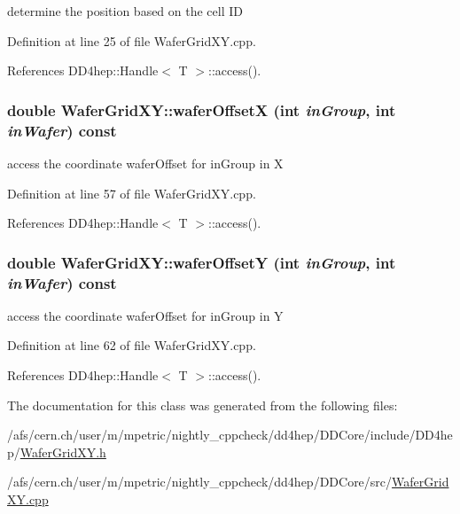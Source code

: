 determine the position based on the cell ID 

Definition at line 25 of file WaferGridXY.cpp.

References DD4hep::Handle$<$ T $>$::access().\hypertarget{class_d_d4hep_1_1_geometry_1_1_wafer_grid_x_y_a587a683c8e578dfe12d5d8ebbcf02633}{
\subsubsection[{waferOffsetX}]{\setlength{\rightskip}{0pt plus 5cm}double WaferGridXY::waferOffsetX (int {\em inGroup}, \/  int {\em inWafer}) const}}
\label{class_d_d4hep_1_1_geometry_1_1_wafer_grid_x_y_a587a683c8e578dfe12d5d8ebbcf02633}


access the coordinate waferOffset for inGroup in X 

Definition at line 57 of file WaferGridXY.cpp.

References DD4hep::Handle$<$ T $>$::access().\hypertarget{class_d_d4hep_1_1_geometry_1_1_wafer_grid_x_y_a010307d07b0a6a9d9cc3d5a8655864b7}{
\subsubsection[{waferOffsetY}]{\setlength{\rightskip}{0pt plus 5cm}double WaferGridXY::waferOffsetY (int {\em inGroup}, \/  int {\em inWafer}) const}}
\label{class_d_d4hep_1_1_geometry_1_1_wafer_grid_x_y_a010307d07b0a6a9d9cc3d5a8655864b7}


access the coordinate waferOffset for inGroup in Y 

Definition at line 62 of file WaferGridXY.cpp.

References DD4hep::Handle$<$ T $>$::access().

The documentation for this class was generated from the following files:\begin{DoxyCompactItemize}
\item 
/afs/cern.ch/user/m/mpetric/nightly\_\-cppcheck/dd4hep/DDCore/include/DD4hep/\hyperlink{_d_d_core_2include_2_d_d4hep_2_wafer_grid_x_y_8h}{WaferGridXY.h}\item 
/afs/cern.ch/user/m/mpetric/nightly\_\-cppcheck/dd4hep/DDCore/src/\hyperlink{_d_d_core_2src_2_wafer_grid_x_y_8cpp}{WaferGridXY.cpp}\end{DoxyCompactItemize}
